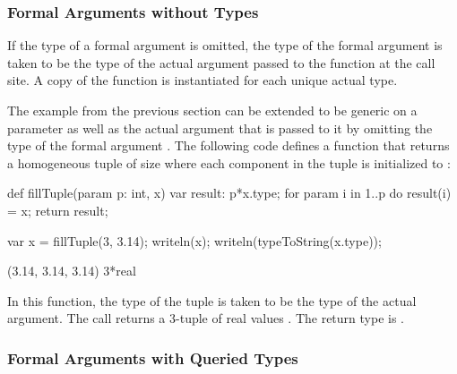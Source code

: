 \subsubsection{Formal Arguments without Types}
\label{Formal_Arguments_without_Types}

If the type of a formal argument is omitted, the type of the formal
argument is taken to be the type of the actual argument passed to the
function at the call site.  A copy of the function is instantiated for
each unique actual type.
\begin{example}
The example from the previous section can be extended to be generic on
a parameter as well as the actual argument that is passed to it by
omitting the type of the formal argument .  The following code
defines a function that returns a homogeneous tuple of size 
where each component in the tuple is initialized to :
\begin{chapelpre}
\end{chapelpre}
\begin{chapel}
def fillTuple(param p: int, x) {
  var result: p*x.type;
  for param i in 1..p do
    result(i) = x;
  return result;
}
\end{chapel}
\begin{chapelpost}
var x = fillTuple(3, 3.14);
writeln(x);
writeln(typeToString(x.type));
\end{chapelpost}
\begin{chapeloutput}
(3.14, 3.14, 3.14)
3*real
\end{chapeloutput}
In this function, the type of the tuple is taken to be the type of the
actual argument.  The call  returns a 3-tuple
of real values .  The return type is
.
\end{example}

\subsubsection{Formal Arguments with Queried Types}
\label{Formal_Arguments_with_Queried_Types}

